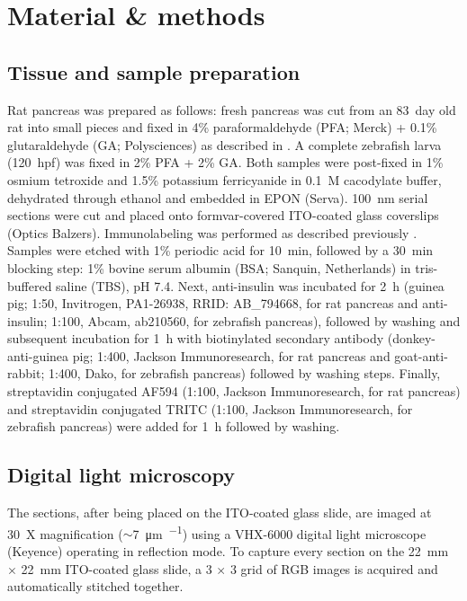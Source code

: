 \section{Material \& methods}
\label{sec:3.2_methods}


\subsection{Tissue and sample preparation}
\label{sec:3M_prep}
Rat pancreas was prepared as follows: fresh pancreas was cut from an \SI{83}{day} old rat into small pieces and fixed in 4\% paraformaldehyde (PFA; Merck) + 0.1\% glutaraldehyde (GA; Polysciences) as described in \textcite{ravelli2013destruction}. A complete zebrafish larva (\SI{120}{hpf}) was fixed in 2\% PFA + 2\% GA. Both samples were post-fixed in 1\% osmium tetroxide and 1.5\% potassium ferricyanide in \SI{0.1}{M} cacodylate buffer, dehydrated through ethanol and embedded in EPON (Serva). \SI{100}{\nano\meter} serial sections were cut and placed onto formvar-covered ITO-coated glass coverslips (Optics Balzers). Immunolabeling was performed as described previously \cite{kuipers2015scanning}. Samples were etched with 1\% periodic acid for \SI{10}{\minute}, followed by a \SI{30}{\minute} blocking step: 1\% bovine serum albumin (BSA; Sanquin, Netherlands) in tris-buffered saline (TBS), pH 7.4. Next, anti-insulin was incubated for \SI{2}{\hour} (guinea pig; 1:50, Invitrogen, PA1-26938, RRID: AB\_794668, for rat pancreas and anti-insulin; 1:100, Abcam, ab210560, for zebrafish pancreas), followed by washing and subsequent incubation for \SI{1}{\hour} with biotinylated secondary antibody (donkey-anti-guinea pig; 1:400, Jackson Immunoresearch, for rat pancreas and goat-anti-rabbit; 1:400, Dako, for zebrafish pancreas) followed by washing steps. Finally, streptavidin conjugated AF594 (1:100, Jackson Immunoresearch, for rat pancreas) and streptavidin conjugated TRITC (1:100, Jackson Immunoresearch, for zebrafish pancreas) were added for \SI{1}{\hour} followed by washing.


\subsection{Digital light microscopy}
\label{sec:3M_keyence}
The sections, after being placed on the ITO-coated glass slide, are imaged at \SI{30}{X} magnification (${\sim}$\SI{7}{\micro\meter\per\pixel}) using a VHX-6000 digital light microscope (Keyence) operating in reflection mode. To capture every section on the \SI{22}{\milli\meter} $\times$ \SI{22}{\milli\meter} ITO-coated glass slide, a 3 $\times$ 3 grid of RGB images is acquired and automatically stitched together.


